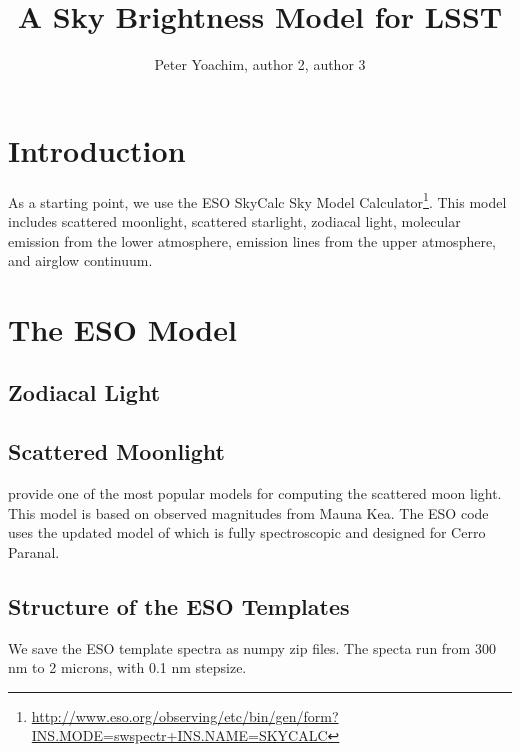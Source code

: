 \documentclass{emulateapj}  %
\begin{document}
\title{A Sky Brightness Model for LSST}


\author{Peter Yoachim, author 2, author 3}


\begin{abstract}

\end{abstract}


\section{Introduction}

As a starting point, we use the ESO SkyCalc Sky Model Calculator\footnote{\url{http://www.eso.org/observing/etc/bin/gen/form?INS.MODE=swspectr+INS.NAME=SKYCALC}}.  This model includes scattered moonlight, scattered starlight, zodiacal light, molecular emission from the lower atmosphere, emission lines from the upper atmosphere, and airglow continuum.  




\section{The ESO Model}


\subsection{Zodiacal Light}

\subsection{Scattered Moonlight}

\citet{Krisciunas91} provide one of the most popular models for computing the scattered moon light. This model is based on observed magnitudes from Mauna Kea. The ESO code uses the updated model of \citet{Jones13} which is fully spectroscopic and designed for Cerro Paranal.

\citet{Noll12}

\subsection{Structure of the ESO Templates}

We save the ESO template spectra as numpy zip files.  The specta run from 300 nm to 2 microns, with 0.1 nm stepsize.
\end{document}
